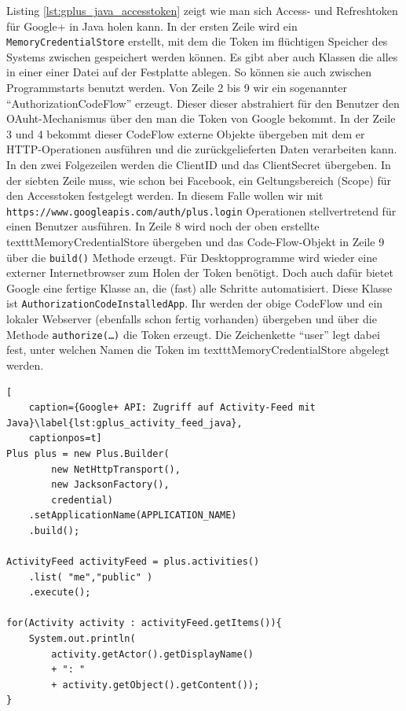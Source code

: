 Listing \ref{lst:gplus_java_accesstoken} zeigt wie man sich Access- und Refreshtoken für Google+ in Java holen kann. In der ersten Zeile wird ein \texttt{MemoryCredentialStore} erstellt, mit dem die Token im flüchtigen Speicher des Systems zwischen gespeichert werden können. Es gibt aber auch Klassen die alles in einer einer Datei auf der Festplatte ablegen. So können sie auch zwischen Programmstarts benutzt werden. Von Zeile 2 bis 9 wir ein sogenannter \enquote{AuthorizationCodeFlow} erzeugt. Dieser dieser abstrahiert für den Benutzer den OAuht-Mechanismus über den man die Token von Google bekommt. In der Zeile 3 und 4 bekommt dieser CodeFlow externe Objekte übergeben mit dem er HTTP-Operationen ausführen und die zurückgelieferten Daten verarbeiten kann. In den zwei Folgezeilen werden die ClientID und das ClientSecret übergeben. In der siebten Zeile muss, wie schon bei Facebook, ein Geltungsbereich (Scope) für den Accesstoken festgelegt werden. In diesem Falle wollen wir mit \texttt{https://www.googleapis.com/auth/plus.login} Operationen stellvertretend für einen Benutzer ausführen. In Zeile 8 wird noch der oben erstellte texttt{MemoryCredentialStore} übergeben und das Code-Flow-Objekt in Zeile 9 über die \texttt{build()} Methode erzeugt. Für Desktopprogramme wird wieder eine externer Internetbrowser zum Holen der Token benötigt. Doch auch dafür bietet Google eine fertige Klasse an, die (fast) alle Schritte automatisiert. Diese Klasse ist \texttt{AuthorizationCodeInstalledApp}. Ihr werden der obige CodeFlow und ein lokaler Webserver (ebenfalls schon fertig vorhanden) übergeben und über die Methode \texttt{authorize(\dots)} die Token erzeugt. Die Zeichenkette \enquote{user} legt dabei fest, unter welchen Namen die Token im texttt{MemoryCredentialStore} abgelegt werden.

\begin{lstlisting}[
    caption={Google+ API: Zugriff auf Activity-Feed mit Java}\label{lst:gplus_activity_feed_java},
    captionpos=t]
Plus plus = new Plus.Builder(
        new NetHttpTransport(), 
        new JacksonFactory(),
        credential)
    .setApplicationName(APPLICATION_NAME)
    .build();

ActivityFeed activityFeed = plus.activities()
    .list( "me","public" )
    .execute();

for(Activity activity : activityFeed.getItems()){
    System.out.println(
        activity.getActor().getDisplayName() 
        + ": " 
        + activity.getObject().getContent());
}
\end{lstlisting}

